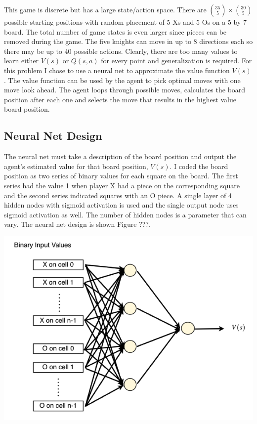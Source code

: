 \documentclass[11pt]{article} %
\begin{document}
\begin{flushleft}
This game is discrete but has a large state/action space.  There are ${35 \choose 5} \times {30 \choose 5}$ possible starting positions with random placement of 5 Xs and 5 Os on a 5 by 7 board.  The total number of game states is even larger since pieces can be removed during the game.  The five knights can move in up to 8 directions each so there may be up to 40 possible actions.  Clearly, there are too many values to learn either $V(s)$ or $Q(s,a)$ for every point and generalization is required.  For this problem I chose to use a neural net to approximate the value function $V(s)$.  The value function can be used by the agent to pick optimal moves with one move look ahead.  The agent loops through possible moves, calculates the board position after each one and selects the move that results in the highest value board position.

\subsection{Neural Net Design}
The neural net must take a description of the board position and output the agent’s estimated value for that board position, $V(s)$.  I coded the board position as two series of binary values for each square on the board.  The first series had the value 1 when player X had a piece on the corresponding square and the second series indicated squares with an O piece.  A single layer of 4 hidden nodes with sigmoid activation is used and the single output node uses sigmoid activation as well.  The number of hidden nodes is a parameter that can vary.  The neural net design is shown Figure ???.

\end{flushleft}
\center
\includegraphics[scale=0.8]{fig11}
\end{document}
